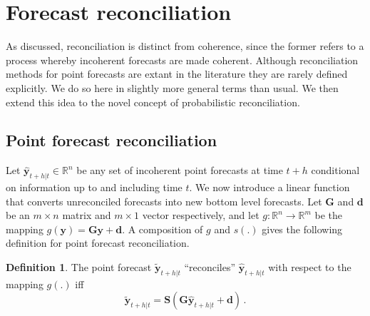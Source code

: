\documentclass[12pt]{article}
\theoremstyle{definition}
\newtheorem{definition}{Definition}[section]
\begin{document}
\section{Forecast reconciliation}\label{sec:reconciliation}

As discussed, reconciliation is distinct from coherence, since the former refers to a process whereby incoherent forecasts are made coherent. Although reconciliation methods for point forecasts are extant in the literature they are rarely defined explicitly.  We do so here in slightly more general terms than usual. We then extend this idea to the novel concept of probabilistic reconciliation.

\subsection{Point forecast reconciliation}

Let $\hat{\bm{y}}_{t+h|t} \in \mathbb{R}^n$ be any set of incoherent point forecasts at time $t+h$ conditional on information up to and including time $t$. We now introduce a linear function that converts unreconciled forecasts into new bottom level forecasts.
Let $\bm{G}$ and $\bm{d}$ be an $m\times n$ matrix and $m\times 1$ vector respectively, and let $g:\mathbb{R}^n \rightarrow \mathbb{R}^m$ be the mapping $g(\bm{y})=\bm{G}\bm{y}+\bm{d}$.  A composition of $g$ and $s(.)$ gives the following definition for point forecast reconciliation.

\begin{definition}\label{def:reconpoint}
	The point forecast $\tilde{\bm{y}}_{t+h|t}$ ``reconciles'' $\hat{\bm{y}}_{t+h|t}$ with respect to the mapping $g(.)$ iff
	\begin{equation}
	  \tilde{\bm{y}}_{t+h|t}=\bm{S}(\bm{G}\hat{\bm{y}}_{t+h|t}+\bm{d})\,.
	\end{equation}
\end{definition}
\end{document}
